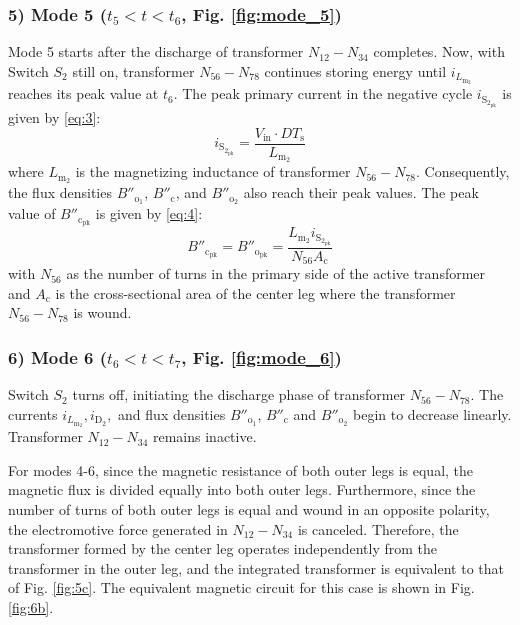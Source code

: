\documentclass[lettersize,journal]{IEEEtran}
\begin{document}
\subsubsection*{\textup{5) Mode 5 ($t_5 < t < t_6$, \textup{Fig. \ref{fig:mode_5}})}}
Mode 5 starts after the discharge of transformer $N_{12}-N_{34}$ completes. Now, with Switch $S_2$ still on, transformer $N_{56}-N_{78}$ continues storing energy until $i_{L_{\mathrm{m}_2}}$ reaches its peak value at $t_6$. The peak primary current in the negative cycle $i_{\mathrm{S}_{2_{\mathrm{pk}}}}$ is given by \eqref{eq:3}:
\begin{equation}
\label{eq:3}
i_{\mathrm{S}_{2_{\mathrm{pk}}}} = \frac{V_{\mathrm{in}} \cdot DT_{\mathrm{s}}}{L_{\mathrm{m}_2}}
\end{equation}
where $L_{\mathrm{m}_2}$ is the magnetizing inductance of transformer $N_{56}-N_{78}$. Consequently, the flux densities $B''_{\mathrm{o}_1}$, $B''_{\mathrm{c}}$, and $B''_{\mathrm{o}_2}$ also reach their peak values. The peak value of $B''_{\mathrm{c}_{\mathrm{pk}}}$ is given by \eqref{eq:4}:
\begin{equation}
\label{eq:4}
B''_{\mathrm{c}_{\mathrm{pk}}} = B''_{\mathrm{o}_{\mathrm{pk}}} = \frac{L_{\mathrm{m}_2} i_{\mathrm{S}_{2_{\mathrm{pk}}}}}{N_{56} A_{\mathrm{c}}}
\end{equation}
with $N_{56}$ as the number of turns in the primary side of the active transformer and $A_{\mathrm{c}}$ is the cross-sectional area of the center leg where the transformer $N_{56}-N_{78}$ is wound.

\subsubsection*{\textup{6) Mode 6 ($t_6 < t < t_7$, \textup{Fig. \ref{fig:mode_6}})}}
Switch $S_2$ turns off, initiating the discharge phase of transformer $N_{56}-N_{78}$. The currents $i_{L_{\mathrm{m}_2}}, i_{\mathrm{D}_2},$ and flux densities $B''_{\mathrm{o}_1}$, $B''_{\mathrm{c}}$ and $B''_{\mathrm{o}_2}$ begin to decrease linearly. Transformer $N_{12}-N_{34}$ remains inactive.

For modes 4-6, since the magnetic resistance of both outer legs is equal, the magnetic flux is divided equally into both outer legs. Furthermore, since the number of turns of both outer legs is equal and wound in an opposite polarity, the electromotive force generated in $N_{12}-N_{34}$ is canceled. Therefore, the transformer formed by the center leg operates independently from the transformer in the outer leg, and the integrated transformer is equivalent to that of Fig. \ref{fig:5c}. The equivalent magnetic circuit for this case is shown in Fig. \ref{fig:6b}.
\end{document}
